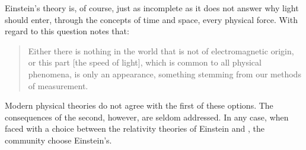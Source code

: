 Einstein's theory is, of course,
just as incomplete as it does not answer why
light should enter, through the concepts of time and space, every physical force.
With regard to this question \Poincare\cite{Poincare1906} notes that:
\begin{quote}
  Either there is nothing in the world that is not of electromagnetic origin,
  or this part [the speed of light], which is common to all physical phenomena,
  is only an appearance, something stemming from our methods of measurement.
\end{quote}
Modern physical theories do not agree with the first of these options.
The consequences of the second, however, 
are seldom addressed.
%
%
In any case, when faced with a choice between the relativity theories of Einstein and \Poincare, the community choose Einstein's.



